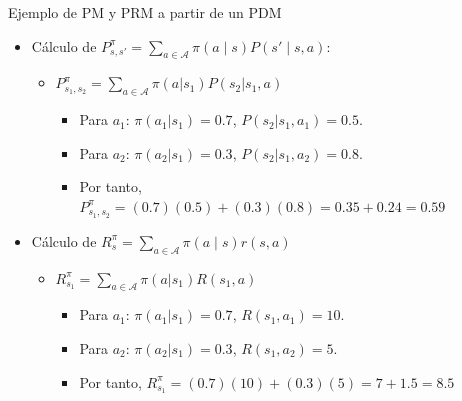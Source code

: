 \documentclass[10pt, envcountsect, handout, aspectratio=1610, hyperref={hypertexnames=true}]{beamer}
\begin{document}
\begin{frame}{Ejemplo de PM y PRM a partir de un PDM}
\begin{itemize}
\begin{itemize}
\item Matriz de recompensas:  \qquad \qquad \qquad \quad \(R(s,a) = 
                            \begin{bmatrix}
                            R(s_1, a_1) & R(s_1, a_2) \\
                            R(s_2, a_1) & R(s_2, a_2)
                            \end{bmatrix}
                            \qquad
                            =
                            \begin{bmatrix}
                            10 & 5 \\
                            2 & 8
                            \end{bmatrix}
                            \)
\end{itemize}

\item Cálculo de \( P_{s,s'}^\pi =   \sum_{a \in \mathcal{A}} \pi(a \mid s) P(s' \mid s, a) \):

    \begin{itemize}
    \item \( P_{s_1,s_2}^\pi =   \sum_{a \in \mathcal{A}} \pi(a|s_1) P(s_2|s_1, a)\)
    	\begin{itemize}
    	\item Para \(a_1\): \(\pi(a_1|s_1) = 0.7\), \(P(s_2|s_1, a_1) = 0.5\).
    	\item Para \(a_2\): \(\pi(a_2|s_1) = 0.3\), \(P(s_2|s_1, a_2) = 0.8\).
    	\item Por tanto, $P_{s_1,s_2}^\pi = (0.7)(0.5) + (0.3)(0.8) = 0.35 + 0.24 = 0.59$
    	\end{itemize}
	\end{itemize}

\item Cálculo de $R_s^{\pi}  = \sum_{a \in \mathcal{A}} \pi(a \mid s) r(s, a) $
	\begin{itemize}
        \item \(  R_{s_1}^\pi = \sum_{a \in \mathcal{A}} \pi(a|s_1) R(s_1, a)\) 
        	\begin{itemize}
    		\item Para \(a_1\): \(\pi(a_1|s_1) = 0.7\), \(R(s_1, a_1) = 10\).
    		\item Para \(a_2\): \(\pi(a_2|s_1) = 0.3\), \(R(s_1, a_2) = 5\).
    		\item Por tanto, \(R_{s_1}^\pi = (0.7)(10) + (0.3)(5) = 7 + 1.5 = 8.5\)
    		\end{itemize}
	\end{itemize}
\end{itemize}



\end{frame}
\end{document}
